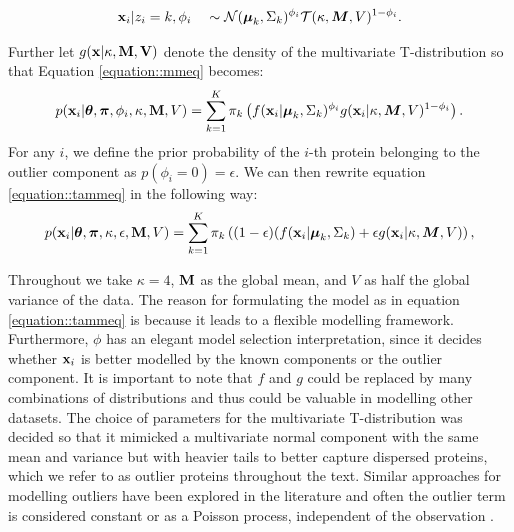 \documentclass[12pt,english]{article}
\begin{document}
\begin{align}
{\bf x}_i | z_i = k, \phi_i \quad \sim \mathcal{N}(\boldsymbol{\mu}_k, \Sigma_k)^{\phi_i}\mathcal{T}(\kappa, \boldsymbol{M}, V)^{1 - \phi_i }.
\end{align}

Further let $g({\bf x | \kappa, \bf{M}, V} )$ denote the density of the multivariate T-distribution so that Equation \eqref{equation::mmeq} becomes:
\begin{equation} \label{equation::tammeq}
  \begin{split}
    p({\bf x}_i| \boldsymbol{\theta}, \boldsymbol{\pi} ,\phi_i, \kappa, {\bf M}, V) &=  \sum_{k=1}^{K}\pi_k\left(f({\bf x}_i|\boldsymbol{\mu}_k, \Sigma_k)^{\phi_i}g({\bf x}_i|\kappa, \boldsymbol{M}, V)^{1 - \phi_i }\right).\\
  \end{split}
\end{equation}
For any $i$, we define the prior probability of the $i$-th protein belonging to the outlier component as $p(\phi_i = 0) = \epsilon$.
We can then rewrite equation \eqref{equation::tammeq} in the following way:
\begin{equation}\label{equation::tammepseq}
  \begin{split}
    p({\bf x}_i| \boldsymbol{\theta}, \boldsymbol{\pi} , \kappa, \epsilon, {\bf M}, V) &=  \sum_{k=1}^{K}\pi_k\left((1-\epsilon)(f({\bf x}_i |\boldsymbol{\mu}_k, \Sigma_k) + \epsilon g({\bf x}_i|\kappa, \boldsymbol{M}, V)\right),\\
  \end{split}
\end{equation}

Throughout we take $\kappa = 4$, ${\bf M}$ as the global mean, and $V$ as half the global variance of the
data. The reason for formulating the model as in equation \eqref{equation::tammeq} is because it leads to a flexible
modelling framework. Furthermore, $\phi$ has an elegant model selection interpretation, since it decides whether
${\bf x}_i$ is better modelled by the known components or the outlier component.
It is important to note that $f$ and $g$ could be replaced by many combinations
of distributions and thus could be valuable in modelling other datasets. The choice of parameters for the
multivariate T-distribution was decided so that it mimicked a multivariate normal component with the
same mean and variance but with heavier tails to better capture dispersed proteins, which we refer
to as outlier proteins throughout the text.
Similar approaches for modelling outliers have
been explored in the literature and often the outlier term is
considered constant or as a Poisson process, independent of
the observation \citep{Banfield::1993, Cooke::2011,
  Coretto::2016, Hennig::2004}.
\end{document}
